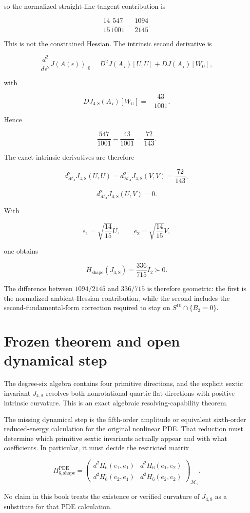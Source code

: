 so the normalized straight-line tangent contribution is

\[
\frac{14}{15}\frac{547}{1001}=\frac{1094}{2145}.
\]

This is not the constrained Hessian. The intrinsic second derivative is

\[
\frac{d^2}{d\epsilon^2}J(A(\epsilon))\Big|_0
=D^2J(A_\star)[U,U]+DJ(A_\star)[W_U],
\]

with

\[
DJ_{4,8}(A_\star)[W_U]=-\frac{43}{1001}.
\]

Hence

\[
\frac{547}{1001}-\frac{43}{1001}=\frac{72}{143}.
\]

The exact intrinsic derivatives are therefore

\[
d^2_{\mathcal M_4}J_{4,8}(U,U)
=d^2_{\mathcal M_4}J_{4,8}(V,V)
=\frac{72}{143},
\]

\[
d^2_{\mathcal M_4}J_{4,8}(U,V)=0.
\]

With

\[
e_1=\sqrt{\frac{14}{15}}U,
\qquad
e_2=\sqrt{\frac{14}{15}}V,
\]

one obtains

\[
\boxed{
H_{\mathrm{shape}}(J_{4,8})=\frac{336}{715}I_2\succ0.
}
\]

The difference between $1094/2145$ and $336/715$ is therefore geometric: the first is the normalized ambient-Hessian contribution, while the second includes the second-fundamental-form correction required to stay on $S^{10}\cap\{B_2=0\}$.

\section*{Frozen theorem and open dynamical step}

The degree-six algebra contains four primitive directions, and the explicit sextic invariant $J_{4,8}$ resolves both nonrotational quartic-flat directions with positive intrinsic curvature. This is an exact algebraic resolving-capability theorem.

The missing dynamical step is the fifth-order amplitude or equivalent sixth-order reduced-energy calculation for the original nonlinear PDE. That reduction must determine which primitive sextic invariants actually appear and with what coefficients. In particular, it must decide the restricted matrix

\[
H_{6,\mathrm{shape}}^{\mathrm{PDE}}
=
\begin{pmatrix}
 d^2H_6(e_1,e_1) & d^2H_6(e_1,e_2)\\
 d^2H_6(e_2,e_1) & d^2H_6(e_2,e_2)
\end{pmatrix}_{\mathcal M_4}.
\]

No claim in this book treats the existence or verified curvature of $J_{4,8}$ as a substitute for that PDE calculation.
